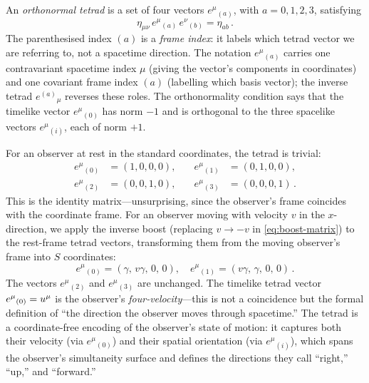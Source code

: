 An \emph{orthonormal tetrad} is a set of four vectors
$e^\mu{}_{(a)}$, with $a = 0, 1, 2, 3$, satisfying
%
\begin{equation}
  \eta_{\mu\nu}\, e^\mu{}_{(a)}\, e^\nu{}_{(b)}
    = \eta_{ab} \,.
  \label{eq:tetrad-orthonormality}
\end{equation}
%
The parenthesised index $(a)$ is a \emph{frame index}: it labels which tetrad
vector we are referring to, not a spacetime direction.  The notation
$e^\mu{}_{(a)}$ carries one contravariant spacetime index $\mu$ (giving the
vector's components in coordinates) and one covariant frame index $(a)$
(labelling which basis vector); the inverse tetrad $e^{(a)}{}_\mu$ reverses
these roles.  The orthonormality condition says that the timelike vector
$e^\mu{}_{(0)}$ has norm $-1$ and is orthogonal to the three spacelike vectors
$e^\mu{}_{(i)}$, each of norm $+1$.

For an observer at rest in the standard coordinates, the tetrad is trivial:
%
\begin{equation}
  \begin{aligned}
    e^\mu{}_{(0)} &= (1,0,0,0), \quad &
    e^\mu{}_{(1)} &= (0,1,0,0), \\
    e^\mu{}_{(2)} &= (0,0,1,0), \quad &
    e^\mu{}_{(3)} &= (0,0,0,1) \,.
  \end{aligned}
  \label{eq:tetrad-rest}
\end{equation}
%
This is the identity matrix---unsurprising, since the observer's frame
coincides with the coordinate frame.  For an observer moving with velocity
$v$ in the $x$-direction, we apply the inverse boost (replacing $v \to -v$ in
\cref{eq:boost-matrix}) to the rest-frame tetrad vectors, transforming them
from the moving observer's frame into $S$ coordinates:
%
\begin{equation}
  e^\mu{}_{(0)} = (\gamma,\, v\gamma,\, 0,\, 0), \quad
  e^\mu{}_{(1)} = (v\gamma,\, \gamma,\, 0,\, 0) \,.
  \label{eq:tetrad-boosted}
\end{equation}
%
The vectors $e^\mu{}_{(2)}$ and $e^\mu{}_{(3)}$ are unchanged.  The timelike
tetrad vector $e^\mu{}_{(0)} = u^{\mu}$ is the observer's
\emph{four-velocity}---this is not a coincidence but the formal definition of
``the direction the observer moves through spacetime.''  The tetrad is a
coordinate-free encoding of the observer's state of motion: it captures both
their velocity (via $e^\mu{}_{(0)}$) and their spatial orientation (via
$e^\mu{}_{(i)}$), which spans the observer's simultaneity surface and defines
the directions they call ``right,'' ``up,'' and ``forward.''

